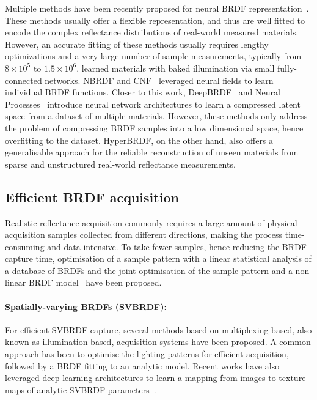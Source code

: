 Multiple methods have been recently proposed for neural \gls{BRDF} representation~\cite{rainer2019neural, hu2020deepbrdf, sztrajman2021neural, zheng2021compact, maximov2019deep, chen2021invertible, fan2021neural, cnf2023}. These methods usually offer a flexible representation, and thus are well fitted to encode the complex reflectance distributions of real-world measured materials. However, an accurate fitting of these methods usually requires lengthy optimizations and a very large number of sample measurements, typically from $8 \times 10^5$ to $1.5 \times 10^6$. \cite{maximov2019deep} learned materials with baked illumination via small fully-connected networks. NBRDF \cite{sztrajman2021neural} and CNF~\cite{cnf2023} leveraged neural fields to learn individual \gls{BRDF} functions. Closer to this work, DeepBRDF~\cite{hu2020deepbrdf} and Neural Processes~\cite{zheng2021compact} introduce neural network architectures to learn a compressed latent space from a dataset of multiple materials. However, these methods only address the problem of compressing \gls{BRDF} samples into a low dimensional space, hence overfitting to the dataset. HyperBRDF, on the other hand, also offers a generalisable approach for the reliable reconstruction of unseen materials from sparse and unstructured real-world reflectance measurements.


\subsection{Efficient BRDF acquisition}
Realistic reflectance acquisition commonly requires a large amount of physical acquisition samples collected from different directions, making the process time-consuming and data intensive. To take fewer samples, hence reducing the \gls{BRDF} capture time, optimisation of a sample pattern with a linear statistical analysis of a database of \gls{BRDF}s \cite{nielsen2015optimal} and the joint optimisation of the sample pattern and a non-linear \gls{BRDF} model~\cite{liu2023learning} have been proposed.

\paragraph{Spatially-varying BRDFs (SVBRDF):} For efficient \gls{SVBRDF} capture, several methods based on multiplexing-based, also known as illumination-based, acquisition systems \cite{kang2018efficient, kang2019learning, ma2021free, ma2023opensvbrdf, tunwattanapong2013acquiring} have been proposed. A common approach has been to optimise the lighting patterns for efficient acquisition, followed by a \gls{BRDF} fitting to an analytic model. Recent works have also leveraged deep learning architectures to learn a mapping from images to texture maps of analytic SVBRDF parameters~\cite{guo2021highlight, hui2017reflectance, deschaintre2018single, deschaintre2019flexible, martin2022materia, zhou2021adversarial,gao2019deep}. 

